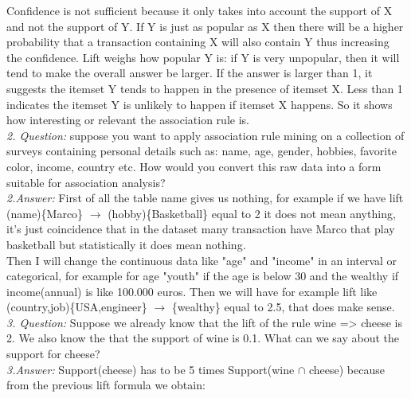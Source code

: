\documentclass[a4paper]{article}
\begin{document}
	Confidence is not sufficient because it only takes into account the support of X and not the support of Y. If Y is just as popular as X then there will be a higher probability that a transaction containing X will also contain Y thus increasing the confidence. Lift weighs how popular Y is: if Y is very unpopular, then it will tend to make the overall answer be larger. If the answer is larger than 1, it suggests the itemset Y tends to happen in the presence of itemset X. Less than 1 indicates the itemset Y is unlikely to happen if itemset X happens. So it shows how interesting or relevant the association rule is. \\
	\newline
	\textit{2. Question:} suppose you want to apply association rule mining on a collection of surveys containing
	personal details such as: name, age, gender, hobbies, favorite color, income, country etc.
	How would you convert this raw data into a form suitable for association analysis? \\
	\textit{2.Answer:} First of all the table name gives us nothing, for example if we have lift (name)\{Marco\} $\rightarrow$ (hobby)\{Basketball\} equal to 2 it does not mean anything, it's just coincidence that in the dataset many transaction have Marco that play basketball but statistically it does mean nothing.\\
	Then I will change the continuous data like "age" and "income" in an interval or categorical, for example for age "youth" if the age is below 30 and the wealthy if income(annual) is like 100.000 euros. Then we will have for example lift like (country,job)\{USA,engineer\} $\rightarrow$ \{wealthy\} equal to 2.5, that does make sense.\\  
	\newline
	\textit{3. Question:} Suppose we already know that the lift of the rule wine => cheese is 2. We also know the
	that the support of wine is 0.1. What can we say about the support for cheese?\\
	\textit{3.Answer:} Support(cheese) has to be 5 times Support(wine $\cap$ cheese) because from the previous lift formula we obtain:
	
\end{document}
